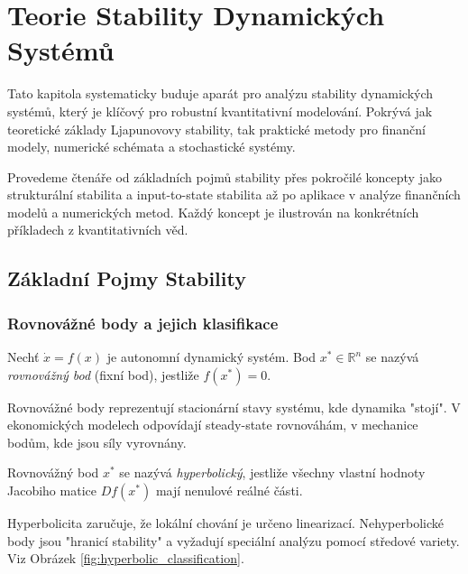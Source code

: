 \section{Teorie Stability Dynamických Systémů}
\label{sec:teorie-stability}

Tato kapitola systematicky buduje aparát pro analýzu stability dynamických systémů, který je klíčový pro robustní kvantitativní modelování. Pokrývá jak teoretické základy Ljapunovovy stability, tak praktické metody pro finanční modely, numerické schémata a stochastické systémy.

Provedeme čtenáře od základních pojmů stability přes pokročilé koncepty jako strukturální stabilita a input-to-state stabilita až po aplikace v analýze finančních modelů a numerických metod. Každý koncept je ilustrován na konkrétních příkladech z kvantitativních věd.


\spc

\subsection{Základní Pojmy Stability}

\subsubsection{Rovnovážné body a jejich klasifikace}

\begin{definition}
Nechť $\dot{x} = f(x)$ je autonomní dynamický systém. Bod $x^* \in \mathbb{R}^n$ se nazývá \emph{rovnovážný bod} (fixní bod), jestliže $f(x^*) = 0$.
\end{definition}

\begin{intuition}
Rovnovážné body reprezentují stacionární stavy systému, kde dynamika "stojí". V ekonomických modelech odpovídají steady-state rovnováhám, v mechanice bodům, kde jsou síly vyrovnány.
\end{intuition}

\begin{definition}
Rovnovážný bod $x^*$ se nazývá \emph{hyperbolický}, jestliže všechny vlastní hodnoty Jacobiho matice $Df(x^*)$ mají nenulové reálné části.
\end{definition}

\begin{intuition}
Hyperbolicita zaručuje, že lokální chování je určeno linearizací. Nehyperbolické body jsou "hranicí stability" a vyžadují speciální analýzu pomocí středové variety. Viz Obrázek \ref{fig:hyperbolic_classification}.
\end{intuition}

